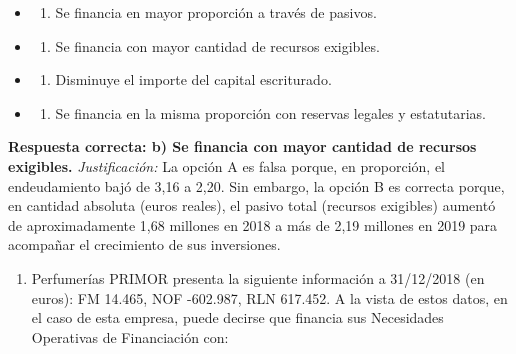 \documentclass[12pt]{book} %
\providecommand{\tightlist}{%
  \setlength{\itemsep}{0pt}\setlength{\parskip}{0pt}}
\begin{document}
\begin{itemize}
\item
  \begin{enumerate}
  \def\labelenumi{\alph{enumi})}
  \tightlist
  \item
    Se financia en mayor proporción a través de pasivos.
  \end{enumerate}
\item
  \begin{enumerate}
  \def\labelenumi{\alph{enumi})}
  \setcounter{enumi}{1}
  \tightlist
  \item
    Se financia con mayor cantidad de recursos exigibles.
  \end{enumerate}
\item
  \begin{enumerate}
  \def\labelenumi{\alph{enumi})}
  \setcounter{enumi}{2}
  \tightlist
  \item
    Disminuye el importe del capital escriturado.
  \end{enumerate}
\item
  \begin{enumerate}
  \def\labelenumi{\alph{enumi})}
  \setcounter{enumi}{3}
  \tightlist
  \item
    Se financia en la misma proporción con reservas legales y
    estatutarias.
  \end{enumerate}
\end{itemize}

\textbf{Respuesta correcta: b) Se financia con mayor cantidad de
recursos exigibles.} \emph{Justificación:} La opción A es falsa porque,
en proporción, el endeudamiento bajó de 3,16 a 2,20. Sin embargo, la
opción B es correcta porque, en cantidad absoluta (euros reales), el
pasivo total (recursos exigibles) aumentó de aproximadamente 1,68
millones en 2018 a más de 2,19 millones en 2019 para acompañar el
crecimiento de sus inversiones.

\begin{enumerate}
\def\labelenumi{\arabic{enumi}.}
\setcounter{enumi}{2}
\tightlist
\item
  Perfumerías PRIMOR presenta la siguiente información a 31/12/2018 (en
  euros): FM 14.465, NOF -602.987, RLN 617.452. A la vista de estos
  datos, en el caso de esta empresa, puede decirse que financia sus
  Necesidades Operativas de Financiación con:
\end{enumerate}
\end{document}

